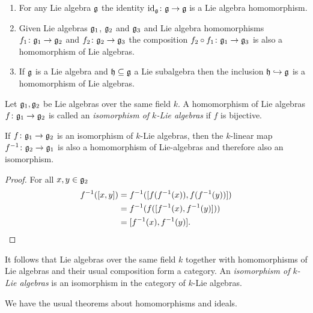 \begin{expls}
 \begin{enumerate}[leftmargin=*]
  \item
   For any Lie algebra $\mathfrak{g}$ the identity $\operatorname{id}_{\mathfrak{g}} \colon \mathfrak{g} \to \mathfrak{g}$ is a Lie algebra homomorphism.
  \item
   Given Lie algebras $\mathfrak{g}_1$, $\mathfrak{g}_2$ and $\mathfrak{g}_3$ and Lie algebra homomorphisms $f_1 \colon \mathfrak{g}_1 \to \mathfrak{g}_2$ and $f_2 \colon \mathfrak{g}_2 \to \mathfrak{g}_3$ the composition $f_2 \circ f_1 \colon \mathfrak{g}_1 \to \mathfrak{g}_3$ is also a homomorphism of Lie algebras.
  \item
   If $\mathfrak{g}$ is a Lie algebra and $\mathfrak{h} \subseteq \mathfrak{g}$ a Lie subalgebra then the inclusion $\mathfrak{h} \hookrightarrow \mathfrak{g}$ is a homomorphism of Lie algebras.
 \end{enumerate}
\end{expls}


\begin{defi}
 Let $\mathfrak{g}_1, \mathfrak{g}_2$ be Lie algebras over the same field $k$. A homomorphism of Lie algebras $f \colon \mathfrak{g}_1 \to \mathfrak{g}_2$ is called an \emph{isomorphism of $k$-Lie algebras} if $f$ is bijective.
\end{defi}


\begin{lem}
 If $f \colon \mathfrak{g}_1 \to \mathfrak{g}_2$ is an isomorphism of $k$-Lie algebras, then the $k$-linear map $f^{-1} \colon \mathfrak{g}_2 \to \mathfrak{g}_1$ is also a homomorphism of Lie-algebras and therefore also an isomorphism.
\end{lem}
\begin{proof}
 For all $x,y \in \mathfrak{g}_2$
 \begin{align*}
  f^{-1}( [x,y] )
  &= f^{-1}( [ f(f^{-1}(x)), f(f^{-1}(y)) ] ) \\
  &= f^{-1}(f( [f^{-1}(x) , f^{-1}(y)] )) \\
  &= [f^{-1}(x), f^{-1}(y)].
 \qedhere
 \end{align*}
\end{proof}


\begin{rem}
 It follows that Lie algebras over the same field $k$ together with homomorphisms of Lie algebras and their usual composition form a category. An \emph{isomorphism of $k$-Lie algebras} is an isomorphism in the category of $k$-Lie algebras.
\end{rem}


We have the usual theorems about homomorphisms and ideals.


